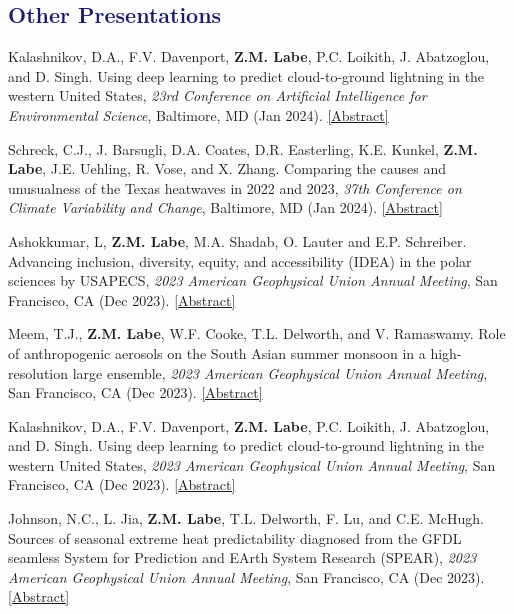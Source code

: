 \documentclass[margin,line,palatino,courier,10pt]{res}
\begin{document}
\begin{resume}
\section{\sc \textcolor{MidnightBlue}{\large{\textbf{Other Presentations}}}} 
\begin{etaremune}[leftmargin=0in,topsep=0in,parsep=0in]
\item Kalashnikov, D.A., F.V. Davenport, \textbf{Z.M. Labe}, P.C. Loikith, J. Abatzoglou, and D. Singh. Using deep learning to predict cloud-to-ground lightning in the western United States, \textit{23rd Conference on Artificial Intelligence for Environmental Science}, Baltimore, MD (Jan 2024). \href{https://ams.confex.com/ams/104ANNUAL/meetingapp.cgi/Paper/431802}{[Abstract]}
\item Schreck, C.J., J. Barsugli, D.A. Coates, D.R. Easterling, K.E. Kunkel, \textbf{Z.M. Labe}, J.E. Uehling, R. Vose, and X. Zhang. Comparing the causes and unusualness of the Texas heatwaves in 2022 and 2023, \textit{37th Conference on Climate Variability and Change}, Baltimore, MD (Jan 2024). \href{https://ams.confex.com/ams/104ANNUAL/meetingapp.cgi/Paper/427912}{[Abstract]}
\item Ashokkumar, L, \textbf{Z.M. Labe}, M.A. Shadab, O. Lauter and E.P. Schreiber. Advancing inclusion, diversity, equity, and accessibility (IDEA) in the polar sciences by USAPECS, \textit{2023 American Geophysical Union Annual Meeting}, San Francisco, CA (Dec 2023). \href{https://agu.confex.com/agu/fm23/meetingapp.cgi/Paper/1431736}{[Abstract]}
\item Meem, T.J., \textbf{Z.M. Labe}, W.F. Cooke, T.L. Delworth, and V. Ramaswamy. Role of anthropogenic aerosols on the South Asian summer monsoon in a high-resolution large ensemble, \textit{2023 American Geophysical Union Annual Meeting}, San Francisco, CA (Dec 2023). \href{https://agu.confex.com/agu/fm23/meetingapp.cgi/Paper/1291065}{[Abstract]}
\item Kalashnikov, D.A., F.V. Davenport, \textbf{Z.M. Labe}, P.C. Loikith, J. Abatzoglou, and D. Singh. Using deep learning to predict cloud-to-ground lightning in the western United States, \textit{2023 American Geophysical Union Annual Meeting}, San Francisco, CA (Dec 2023). \href{https://agu.confex.com/agu/fm23/meetingapp.cgi/Paper/1331607}{[Abstract]}
\item Johnson, N.C., L. Jia, \textbf{Z.M. Labe}, T.L. Delworth, F. Lu, and C.E. McHugh. Sources of seasonal extreme heat predictability diagnosed from the GFDL seamless System for Prediction and EArth System Research (SPEAR), \textit{2023 American Geophysical Union Annual Meeting}, San Francisco, CA (Dec 2023). \href{https://agu.confex.com/agu/fm23/meetingapp.cgi/Paper/1293219}{[Abstract]}

\end{etaremune}
\end{resume}
\end{document}
